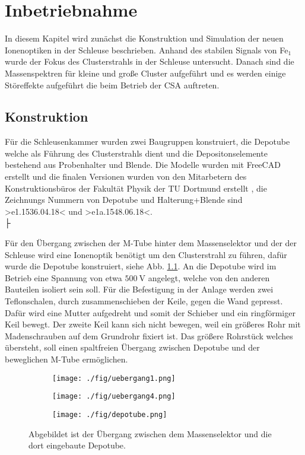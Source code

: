 \chapter{Inbetriebnahme}
In diesem Kapitel wird zunächst die Konstruktion und Simulation der neuen Ionenoptiken in der Schleuse beschrieben.
Anhand des stabilen Signals von Fe$_1$ wurde der Fokus des Clusterstrahls in der Schleuse untersucht.
Danach sind die Massenspektren für kleine und große Cluster aufgeführt und es werden einige Störeffekte aufgeführt die beim Betrieb der CSA auftreten.
\section{Konstruktion}
Für die Schleusenkammer wurden zwei Baugruppen konstruiert, die Depotube welche als Führung des Clusterstrahls dient und die Depositonselemente bestehend aus Probenhalter und Blende. Die Modelle wurden mit FreeCAD\cite{freecad} erstellt und die finalen Versionen wurden von den Mitarbetern des Konstruktionsbüros der Fakultät Physik der TU Dortmund erstellt \cite{konstruktion}, die Zeichnungs Nummern von Depotube und Halterung+Blende sind >e1.1536.04.18< und >e1a.1548.06.18<.
\\├

Für den Übergang zwischen der M-Tube hinter dem Massenselektor und der der Schleuse wird eine Ionenoptik benötigt um den Clusterstrahl zu führen, dafür wurde die Depotube konstruiert, siehe Abb. \ref{fig:depotube}.
An die Depotube wird im Betrieb eine Spannung von etwa $\SI{500}{\volt}$ angelegt, welche von den anderen Bauteilen isoliert sein soll.
Für die Befestigung in der Anlage werden zwei Teflonschalen, durch zusammenschieben der Keile, gegen die Wand gepresst.
Dafür wird eine Mutter aufgedreht und somit der Schieber und ein ringförmiger Keil bewegt.
Der zweite Keil kann sich nicht bewegen, weil ein größeres Rohr mit Madenschrauben auf dem Grundrohr fixiert ist.
Das größere Rohrstück welches übersteht, soll einen spaltfreien Übergang zwischen Depotube und der beweglichen M-Tube ermöglichen.

\begin{figure}
  \begin{subfigure}[h]{1\textwidth}
    \texttt{[image: ./fig/uebergang1.png]}
  \end{subfigure}\hfill
  \begin{subfigure}[h]{1\textwidth}
    \texttt{[image: ./fig/uebergang4.png]}
  \end{subfigure}\hfill
  \begin{subfigure}[h]{1\textwidth}
    \texttt{[image: ./fig/depotube.png]}
  \end{subfigure}
  \caption{Abgebildet ist der Übergang zwischen dem Massenselektor und die dort eingebaute Depotube.}
  \label{fig:depotube}
\end{figure}

